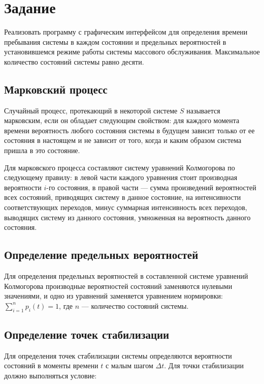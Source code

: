 \chapter{Задание}

Реализовать программу с графическим интерфейсом для определения времени пребывания системы в каждом состоянии и предельных вероятностей в установившемся режиме работы системы массового обслуживания. Максимальное количество состояний системы равно десяти.

\section{Марковский процесс}

Случайный процесс, протекающий в некоторой системе $S$ называется марковским, если он обладает следующим свойством: для каждого момента времени вероятность любого состояния системы в будущем зависит только от ее состояния в настоящем и не зависит от того, когда и каким образом система пришла в это состояние.

Для марковского процесса составляют систему уравнений Колмогорова по следующему правилу: в левой части каждого уравнения стоит производная вероятности $i$-го состояния, в правой части --- сумма произведений вероятностей всех состояний, приводящих систему в данное состояние, на интенсивности соответствующих переходов, минус суммарная интенсивность всех переходов, выводящих систему из данного состояния, умноженная на вероятность данного состояния.

\section{Определение предельных вероятностей}

Для определения предельных вероятностей в составленной системе уравнений Колмогорова производные вероятностей состояний заменяются нулевыми значениями, и одно из уравнений заменяется уравнением нормировки: $\sum_{i = 1}^{n}p_{i}(t) = 1$, где $n$ --- количество состояний системы.

\section{Определение точек стабилизации}

Для определения точек стабилизации системы определяются вероятности состояний в моменты времени $t$ с малым шагом $\Delta t$. Для точки стабилизации должно выполняться условие:


